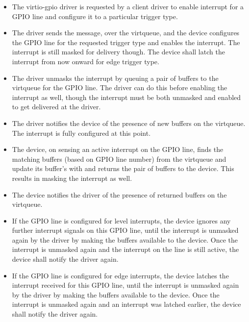 \begin{itemize}
\item The virtio-gpio driver is requested by a client driver to enable interrupt
    for a GPIO line and configure it to a particular trigger type.

\item The driver sends the  message, over
    the  virtqueue, and the device configures the GPIO line for
    the requested trigger type and enables the interrupt. The interrupt is still
    masked for delivery though. The device shall latch the interrupt from now
    onward for edge trigger type.

\item The driver unmasks the interrupt by queuing a pair of buffers to the
     virtqueue for the GPIO line. The driver can do this before
    enabling the interrupt as well, though the interrupt must be both unmasked
    and enabled to get delivered at the driver.

\item The driver notifies the device of the presence of new buffers on the
     virtqueue. The interrupt is fully configured at this point.

\item The device, on sensing an active interrupt on the GPIO line, finds the
    matching buffers (based on GPIO line number) from the 
    virtqueue and update its  buffer's
     with  and returns the
    pair of buffers to the device. This results in masking the interrupt as
    well.

\item The device notifies the driver of the presence of returned buffers on the
     virtqueue.

\item If the GPIO line is configured for level interrupts, the device ignores
    any further interrupt signals on this GPIO line, until the interrupt is
    unmasked again by the driver by making the buffers available to the device.
    Once the interrupt is unmasked again and the interrupt on the line is still
    active, the device shall notify the driver again.

\item If the GPIO line is configured for edge interrupts, the device latches
    the interrupt received for this GPIO line, until the interrupt is unmasked
    again by the driver by making the buffers available to the device. Once the
    interrupt is unmasked again and an interrupt was latched earlier, the
    device shall notify the driver again.


\end{itemize}
